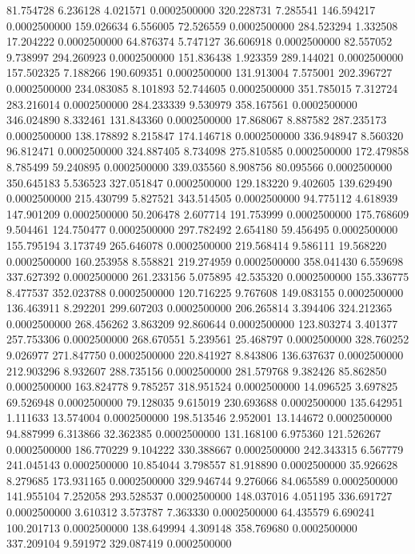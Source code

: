 81.754728 6.236128 4.021571 0.0002500000
320.228731 7.285541 146.594217 0.0002500000
159.026634 6.556005 72.526559 0.0002500000
284.523294 1.332508 17.204222 0.0002500000
64.876374 5.747127 36.606918 0.0002500000
82.557052 9.738997 294.260923 0.0002500000
151.836438 1.923359 289.144021 0.0002500000
157.502325 7.188266 190.609351 0.0002500000
131.913004 7.575001 202.396727 0.0002500000
234.083085 8.101893 52.744605 0.0002500000
351.785015 7.312724 283.216014 0.0002500000
284.233339 9.530979 358.167561 0.0002500000
346.024890 8.332461 131.843360 0.0002500000
17.868067 8.887582 287.235173 0.0002500000
138.178892 8.215847 174.146718 0.0002500000
336.948947 8.560320 96.812471 0.0002500000
324.887405 8.734098 275.810585 0.0002500000
172.479858 8.785499 59.240895 0.0002500000
339.035560 8.908756 80.095566 0.0002500000
350.645183 5.536523 327.051847 0.0002500000
129.183220 9.402605 139.629490 0.0002500000
215.430799 5.827521 343.514505 0.0002500000
94.775112 4.618939 147.901209 0.0002500000
50.206478 2.607714 191.753999 0.0002500000
175.768609 9.504461 124.750477 0.0002500000
297.782492 2.654180 59.456495 0.0002500000
155.795194 3.173749 265.646078 0.0002500000
219.568414 9.586111 19.568220 0.0002500000
160.253958 8.558821 219.274959 0.0002500000
358.041430 6.559698 337.627392 0.0002500000
261.233156 5.075895 42.535320 0.0002500000
155.336775 8.477537 352.023788 0.0002500000
120.716225 9.767608 149.083155 0.0002500000
136.463911 8.292201 299.607203 0.0002500000
206.265814 3.394406 324.212365 0.0002500000
268.456262 3.863209 92.860644 0.0002500000
123.803274 3.401377 257.753306 0.0002500000
268.670551 5.239561 25.468797 0.0002500000
328.760252 9.026977 271.847750 0.0002500000
220.841927 8.843806 136.637637 0.0002500000
212.903296 8.932607 288.735156 0.0002500000
281.579768 9.382426 85.862850 0.0002500000
163.824778 9.785257 318.951524 0.0002500000
14.096525 3.697825 69.526948 0.0002500000
79.128035 9.615019 230.693688 0.0002500000
135.642951 1.111633 13.574004 0.0002500000
198.513546 2.952001 13.144672 0.0002500000
94.887999 6.313866 32.362385 0.0002500000
131.168100 6.975360 121.526267 0.0002500000
186.770229 9.104222 330.388667 0.0002500000
242.343315 6.567779 241.045143 0.0002500000
10.854044 3.798557 81.918890 0.0002500000
35.926628 8.279685 173.931165 0.0002500000
329.946744 9.276066 84.065589 0.0002500000
141.955104 7.252058 293.528537 0.0002500000
148.037016 4.051195 336.691727 0.0002500000
3.610312 3.573787 7.363330 0.0002500000
64.435579 6.690241 100.201713 0.0002500000
138.649994 4.309148 358.769680 0.0002500000
337.209104 9.591972 329.087419 0.0002500000
